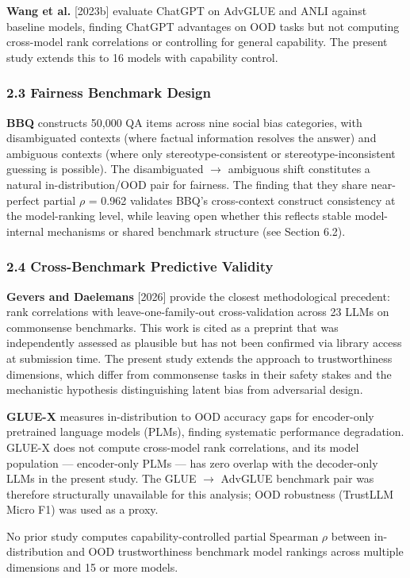 \textbf{Wang et al.} [2023b] evaluate ChatGPT on AdvGLUE and ANLI against baseline models, finding ChatGPT advantages on OOD tasks but not computing cross-model rank correlations or controlling for general capability. The present study extends this to 16 models with capability control.

\subsubsection{2.3 Fairness Benchmark Design}

\textbf{BBQ} \citep{Parrish2022BBQ} constructs 50,000 QA items across nine social bias categories, with disambiguated contexts (where factual information resolves the answer) and ambiguous contexts (where only stereotype-consistent or stereotype-inconsistent guessing is possible). The disambiguated $\rightarrow$ ambiguous shift constitutes a natural in-distribution/OOD pair for fairness. The finding that they share near-perfect partial $\rho$ = 0.962 validates BBQ's cross-context construct consistency at the model-ranking level, while leaving open whether this reflects stable model-internal mechanisms or shared benchmark structure (see Section 6.2).

\subsubsection{2.4 Cross-Benchmark Predictive Validity}

\textbf{Gevers and Daelemans} [2026] provide the closest methodological precedent: rank correlations with leave-one-family-out cross-validation across 23 LLMs on commonsense benchmarks. This work is cited as a preprint that was independently assessed as plausible but has not been confirmed via library access at submission time. The present study extends the approach to trustworthiness dimensions, which differ from commonsense tasks in their safety stakes and the mechanistic hypothesis distinguishing latent bias from adversarial design.

\textbf{GLUE-X} \citep{Yang2023GLUEX} measures in-distribution to OOD accuracy gaps for encoder-only pretrained language models (PLMs), finding systematic performance degradation. GLUE-X does not compute cross-model rank correlations, and its model population --- encoder-only PLMs --- has zero overlap with the decoder-only LLMs in the present study. The GLUE $\rightarrow$ AdvGLUE benchmark pair was therefore structurally unavailable for this analysis; OOD robustness (TrustLLM Micro F1) was used as a proxy.

No prior study computes capability-controlled partial Spearman $\rho$ between in-distribution and OOD trustworthiness benchmark model rankings across multiple dimensions and 15 or more models.


